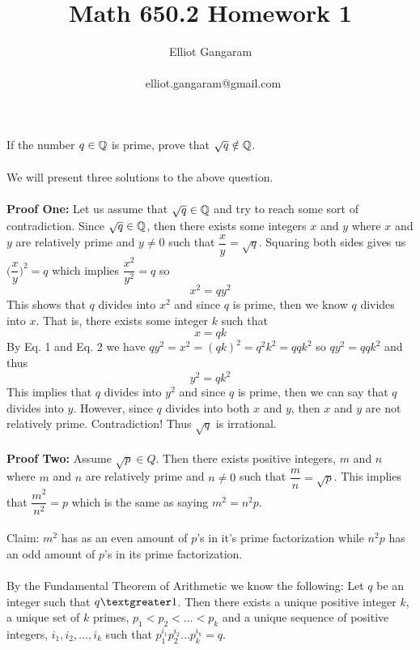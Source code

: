 \documentclass[12pt]{article}
\title{Math 650.2 Homework 1}
\author{Elliot Gangaram\\
\date{}
\ elliot.gangaram@gmail.com \\}
\begin{document}
\maketitle


\problem If the number $q \in \mathbb{Q}$ is prime, prove that $\sqrt{q} \notin \mathbb{Q}$. \\ \\ 
We will present three solutions to the above question. \\ \\
\textbf{Proof One:} Let us assume that $\sqrt{q} \in \mathbb{Q}$ and try to reach some sort of contradiction. Since $\sqrt{q} \in \mathbb{Q}$, then there exists some integers $x$ and $y$  where  $x$ and $y$ are relatively prime and $y \not= 0$ such that $\dfrac{x}{y}=\sqrt{q}$. Squaring both sides gives us $\Big(\dfrac{x}{y}\Big)^{2} = q$ which implies $\dfrac{x^2}{y^2}=q$ so \begin{equation}
 x^2 = qy^2
\end{equation} This shows that $q$ divides into $x^2$ and since $q$ is prime, then we know $q$ divides into $x$. That is, there exists some integer $k$ such that \begin{equation}
x=qk
\end{equation} By Eq. 1 and Eq. 2 we have $qy^2=x^2=(qk)^2=q^2k^2=qqk^2$ so $qy^2=qqk^2$ and thus \begin{equation}
y^2=qk^2
\end{equation} This implies that $q$ divides into $y^2$ and since $q$ is prime, then we can say that $q$ divides into $y$. However, since $q$ divides into both $x$ and $y$, then $x$ and $y$ are not relatively prime. Contradiction! Thus $\sqrt{q}$ is irrational.  \\
\\
\textbf{Proof Two:} Assume $\sqrt{p} \in Q$. Then there exists positive integers, $m$ and $n$ where $m$ and $n$ are relatively prime and $n \not= 0$ such that $\dfrac{m}{n}= \sqrt{p}$. This implies that $\dfrac{m^2}{n^2}= {p}$ which is the same as saying $m^2 = n^2 p$. \\
\\
Claim: $m^2$ has as an even amount of $p$'s in it's prime factorization while $n^2 p$ has an odd amount of $p$'s in its prime factorization. \\ \\ By the Fundamental Theorem of Arithmetic we know the following: Let $q$ be an integer such that $q \textgreater 1$. Then there exists a unique positive integer $k$, a unique set of $k$ primes, $p_1 < p_2 < ... < p_k$ and a unique sequence of  positive integers, $i_1, i_2, ..., i_k$ such that $ p_{1}^{i_{1}} p_{2}^{i_{2}} ... p_{k}^{i_{k}}= q$.\\
\end{document}

